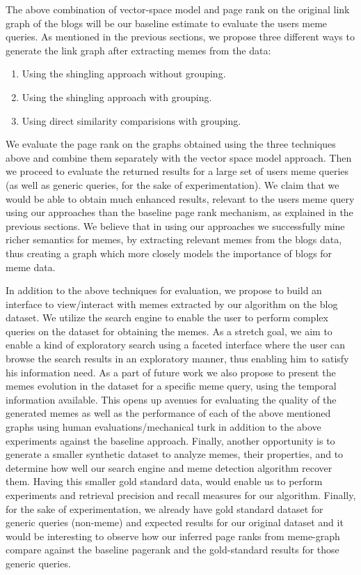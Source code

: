 \documentclass{acm_proc_article-sp}
\begin{document}
The above combination of vector-space model and page rank on the original link graph of the blogs will be our baseline estimate to evaluate the users meme queries. As mentioned in the previous sections, we propose three different ways to generate the link graph after extracting memes from the data:
\begin{enumerate}
\item Using the shingling approach without grouping.
\item Using the shingling approach with grouping.
\item Using direct similarity comparisions with grouping.
\end{enumerate}

We evaluate the page rank on the graphs obtained using the three techniques above and combine them separately with the vector space model approach. Then we proceed to evaluate the returned results for a large set of users meme queries (as well as generic queries, for the sake of experimentation). We claim that we would be able to obtain much enhanced results, relevant to the users meme query using our approaches than the baseline page rank mechanism, as explained in the previous sections. We believe that in using our approaches we successfully mine richer semantics for memes, by extracting relevant memes from the blogs data, thus creating a graph which more closely models the importance of blogs for meme data.

In addition to the above techniques for evaluation, we propose to build an interface to view/interact with memes extracted by our algorithm on the blog dataset. We utilize the search engine to enable the user to perform complex queries on the dataset for obtaining the memes. As a stretch goal, we aim to enable a kind of exploratory search using a faceted interface where the user can browse the search results in an exploratory manner, thus enabling him to satisfy his information need. As a part of future work we also propose to present the memes evolution in the dataset for a specific meme query, using the temporal information available. This opens up avenues for evaluating the quality of the generated memes as well as the performance of each of the above mentioned graphs using human evaluations/mechanical turk in addition to the above experiments against the baseline approach. Finally, another opportunity is to generate a smaller synthetic dataset to analyze memes, their properties, and to determine how well our search engine and meme detection algorithm recover them. Having this smaller gold standard data, would enable us to perform experiments and retrieval precision and recall measures for our algorithm. Finally, for the sake of experimentation, we already have gold standard dataset for generic queries (non-meme) and expected results for our original dataset and it would be interesting to observe how our inferred page ranks from meme-graph compare against the baseline pagerank and the gold-standard results for those generic queries.
\end{document}
